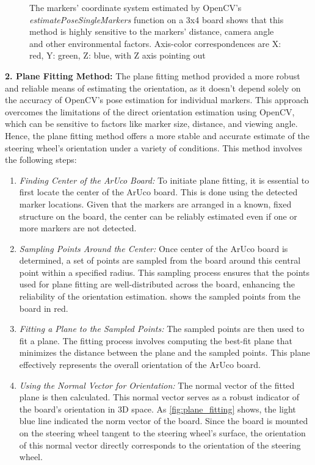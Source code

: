 \begin{figure}[htpb]
\begin{subfigure}[t]{0.23\textwidth}
    \end{subfigure}
    \caption{The markers' coordinate system estimated by OpenCV's
            \emph{estimatePoseSingleMarkers} function on a 3x4
            board shows that this method is highly sensitive
            to the markers' distance, camera angle and other
            environmental factors. Axis-color correspondences are 
            X: red, Y: green, Z: blue, with Z axis pointing out}
    \label{fig:estimatePoseSingleMarkers}
\end{figure}

\textbf{2. Plane Fitting Method: }
The plane fitting method provided a more robust and reliable 
means of estimating the orientation, as it doesn't depend solely 
on the accuracy of OpenCV's pose estimation for individual 
markers. This approach overcomes the limitations of the direct 
orientation estimation using OpenCV, which can be sensitive to 
factors like marker size, distance, and viewing angle. 
Hence, the plane fitting method offers a more stable and 
accurate estimate of the steering wheel's orientation under a 
variety of conditions.
This method involves the following steps:

\begin{enumerate}
    \item \emph{Finding Center of the ArUco Board: }
    To initiate plane fitting, it is essential to first locate 
    the center of the ArUco board. This is done using the 
    detected marker locations. Given that the markers are 
    arranged in a known, fixed structure on the board, 
    the center can be reliably estimated even if one or more 
    markers are not detected.
    \item \emph{Sampling Points Around the Center: }
    Once center of the ArUco board is determined, 
    a set of points are sampled from the board around this 
    central point within a specified radius. This sampling 
    process ensures that the points used for plane fitting are 
    well-distributed across the board, enhancing the reliability 
    of the orientation estimation.  shows 
    the sampled points from the board in red.
    \item \emph{Fitting a Plane to the Sampled Points: }
    The sampled points are then used to fit a plane. 
    The fitting process involves computing the best-fit plane 
    that minimizes the distance between the plane and the 
    sampled points. This plane effectively represents the 
    overall orientation of the ArUco board.
    \item \emph{Using the Normal Vector for Orientation: }
    The normal vector of the fitted plane is then calculated. 
    This normal vector serves as a robust indicator of 
    the board’s orientation in 3D space. As \cref{fig:plane_fitting}
    shows, the light blue line indicated the norm vector of the board.
    Since the board is mounted on the steering wheel tangent to the 
    steering wheel's surface, the orientation of this normal vector 
    directly corresponds to the orientation of the steering wheel.
\end{enumerate}

